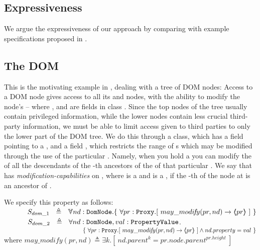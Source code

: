 \subsection{Expressiveness} 

\label{app:expressivity}

We argue the expressiveness of our approach by comparing with example specifications  proposed in \cite{OOPSLA22}.

 

\subsection{The DOM}  %
\label{ss:DOM}
This is the motivating example in \cite{dd},
dealing with a tree of DOM nodes: Access to a DOM node
gives access to all its  and  nodes, with the ability to
modify the node's  -- where  ,  and 
are fields in class . Since the top nodes of the tree
usually contain privileged information, while the lower nodes contain
less crucial third-party information, we must be able to limit 
 access given to third parties to only the lower part of the DOM tree. We do this through a  class, which has a field  pointing to a , and a field , which restricts the range of s which may be modified through the use of the particular . Namely, when you hold a   you can modify the  of all the descendants of the    -th ancestors of the  of that particular .  We say that
 has \emph{modification-capabilities} on , where  is
a   and  is a , if the -th  
of the node at  is an ancestor of .

We specify this property as follows:
\\
$\strut \SPSP  S_{dom\_1}\ \  \triangleq \ \ \TwoStatesN{ nd:\prg{DomNode}}{\  \forall pr:\prg{Proxy}.[ \ may\_modi\!f\!y(pr, nd) \rightarrow \inside{pr}\  ] \ }$ 
\\
$\strut \SPSP  S_{dom\_2}\ \  \triangleq \ \  \forall{ nd:\prg{DomNode}, val:\prg{PropertyValue} }$.\\
$\strut \SPSP\strut \SPSP\strut \SPSP\strut \SPSP	\{ { \ \forall pr:\prg{Proxy}.[ \ may\_modi\!f\!y(pr, nd) \rightarrow \inside{pr}\  ]  \wedge nd.property = val} \ \} $ 
\\
where $may\_modi\!f\!y(pr, nd) \triangleq \exists k. [ \  nd.parent^k=pr.node.parent^{pr.height}\ ]$


